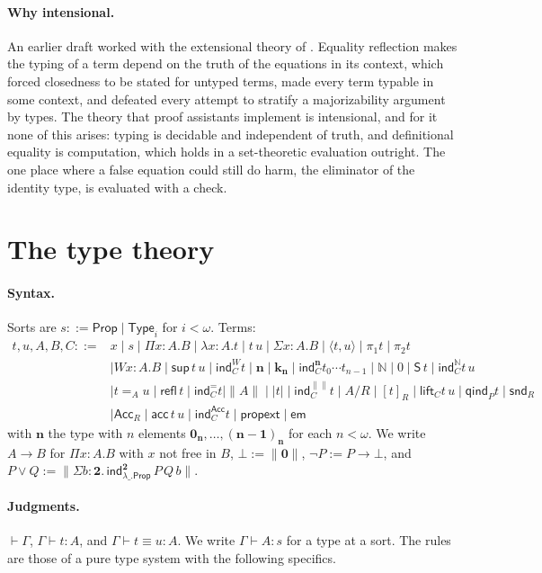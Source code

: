 \documentclass[10pt]{article}
\newcommand{\N}{\mathbb{N}}
\newcommand{\Prop}{\mathsf{Prop}}
\newcommand{\Type}{\mathsf{Type}}
\newcommand{\ind}{\mathsf{ind}}
\newcommand{\Acc}{\mathsf{Acc}}
\newcommand{\refl}{\mathsf{refl}}
\begin{document}
\paragraph{Why intensional.}
An earlier draft \cite[\S8]{paper2} worked with the extensional theory
of \cite{vdbergotten23,paper1}. Equality reflection makes the typing of
a term depend on the truth of the equations in its context, which
forced closedness to be stated for untyped terms, made every term
typable in some context, and defeated every attempt to stratify a
majorizability argument by types. The theory that proof assistants
implement is intensional, and for it none of this arises: typing is
decidable and independent of truth, and definitional equality is
computation, which holds in a set-theoretic evaluation outright. The
one place where a false equation could still do harm, the eliminator of
the identity type, is evaluated with a check.

\section{The type theory}\label{sec:tt}

\paragraph{Syntax.}
Sorts are $s::=\Prop\mid\Type_i$ for $i<\omega$. Terms:
\begin{align*}
t,u,A,B,C::={}&x\mid s\mid\Pi x{:}A.B\mid\lambda x{:}A.t\mid t\,u
  \mid\Sigma x{:}A.B\mid\langle t,u\rangle\mid\pi_1t\mid\pi_2t\\
 &\mid Wx{:}A.B\mid\mathsf{sup}\,t\,u\mid\ind^W_Ct
  \mid\mathbf n\mid\mathbf k_{\mathbf n}\mid\ind^{\mathbf n}_Ct_0\cdots t_{n-1}
  \mid\N\mid0\mid\mathsf S\,t\mid\ind^\N_Ct\,u\\
 &\mid t=_Au\mid\refl\,t\mid\ind^=_Ct
  \mid\|A\|\mid|t|\mid\ind^{\|\|}_Ct
  \mid A/R\mid[t]_R\mid\mathsf{lift}_Ct\,u\mid\mathsf{qind}_Pt\mid\mathsf{snd}_R\\
 &\mid\Acc_R\mid\mathsf{acc}\,t\,u\mid\ind^{\Acc}_Ct
  \mid\mathsf{propext}\mid\mathsf{em}
\end{align*}
with $\mathbf n$ the type with $n$ elements $\mathbf 0_{\mathbf n},\dots,(\mathbf{n{-}1})_{\mathbf n}$
for each $n<\omega$. We write $A\to B$ for $\Pi x{:}A.B$ with $x$ not
free in $B$, $\bot:=\|\mathbf 0\|$, $\neg P:=P\to\bot$, and
$P\vee Q:=\|\Sigma b{:}\mathbf 2.\,\ind^{\mathbf 2}_{\lambda\_.\Prop}\,P\,Q\,b\|$.

\paragraph{Judgments.}
$\vdash\Gamma$, $\Gamma\vdash t:A$, and $\Gamma\vdash t\equiv u:A$. We
write $\Gamma\vdash A:s$ for a type at a sort. The rules are those of a
pure type system with the following specifics.
\end{document}
